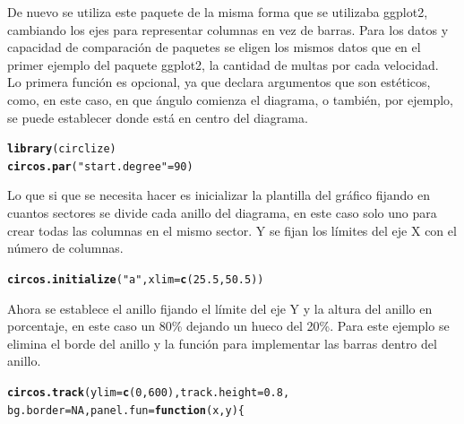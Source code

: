 \documentclass{article}\usepackage[]{graphicx}\usepackage[]{color}
\makeatletter
\newcommand{\hlnum}[1]{\textcolor[rgb]{0.686,0.059,0.569}{#1}}%
\newcommand{\hlstr}[1]{\textcolor[rgb]{0.192,0.494,0.8}{#1}}%
\newcommand{\hlstd}[1]{\textcolor[rgb]{0.345,0.345,0.345}{#1}}%
\newcommand{\hlkwc}[1]{\textcolor[rgb]{0.333,0.667,0.333}{#1}}%
\newcommand{\hlkwd}[1]{\textcolor[rgb]{0.737,0.353,0.396}{\textbf{#1}}}%
\newenvironment{kframe}{%
 \def\at@end@of@kframe{}%
 \ifinner\ifhmode%
  \def\at@end@of@kframe{\end{minipage}}%
  \begin{minipage}{\columnwidth}%
 \fi\fi%
 \def\FrameCommand##1{\hskip\@totalleftmargin \hskip-\fboxsep
 \colorbox{shadecolor}{##1}\hskip-\fboxsep
     \hskip-\linewidth \hskip-\@totalleftmargin \hskip\columnwidth}%
 \MakeFramed {\advance\hsize-\width
   \@totalleftmargin\z@ \linewidth\hsize
   \@setminipage}}%
 {\par\unskip\endMakeFramed%
 \at@end@of@kframe}
\newenvironment{knitrout}{}{} %
\makeatother
\begin{document}
De nuevo se utiliza este paquete\cite{docu_circlize} de la misma forma que se utilizaba ggplot2, cambiando los ejes para representar columnas en vez de barras. Para los datos y capacidad de comparaci\'on de paquetes se eligen los mismos datos que en el primer ejemplo del paquete ggplot2, la cantidad de multas por cada velocidad.~\\
Lo primera funci\'on es opcional, ya que declara argumentos que son est\'eticos, como, en este caso, en que \'angulo comienza el diagrama, o tambi\'en, por ejemplo, se puede establecer donde est\'a en centro del diagrama.
\begin{knitrout}
\color{fgcolor}\begin{kframe}
\begin{alltt}
\hlkwd{library}\hlstd{(circlize)}
\hlkwd{circos.par}\hlstd{(}\hlstr{"start.degree"} \hlstd{=} \hlnum{90}\hlstd{)}
\end{alltt}
\end{kframe}
\end{knitrout}
Lo que si que se necesita hacer es inicializar la plantilla del gr\'afico fijando en cuantos sectores se divide cada anillo del diagrama, en este caso solo uno para crear todas las columnas en el mismo sector. Y se fijan los l\'imites del eje X con el n\'umero de columnas.
\begin{knitrout}
\color{fgcolor}\begin{kframe}
\begin{alltt}
\hlkwd{circos.initialize}\hlstd{(}\hlstr{"a"}\hlstd{,} \hlkwc{xlim} \hlstd{=} \hlkwd{c}\hlstd{(}\hlnum{25.5}\hlstd{,}\hlnum{50.5}\hlstd{))}
\end{alltt}
\end{kframe}
\end{knitrout}
Ahora se establece el anillo fijando el l\'imite del eje Y y la altura del anillo en porcentaje, en este caso un 80\% dejando un hueco del 20\%. Para este ejemplo se elimina el borde del anillo y la funci\'on para implementar las barras dentro del anillo.
\begin{knitrout}
\color{fgcolor}\begin{kframe}
\begin{alltt}
\hlkwd{circos.track}(ylim = \hlkwd{c}(0,600), track.height = 0.8, 
             bg.border = NA, panel.fun = \hlkwd{function}(x, y) \{
\end{alltt}
\end{kframe}
\end{knitrout}
\end{document}
